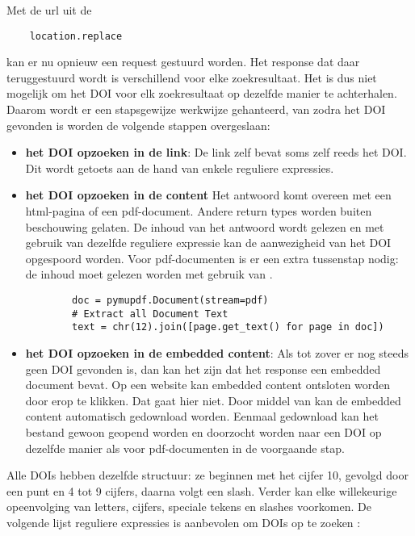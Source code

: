 Met de url uit de \begin{verbatim}
    location.replace
\end{verbatim}
kan er nu opnieuw een request gestuurd worden.
Het response dat daar teruggestuurd wordt is verschillend voor elke zoekresultaat. Het is dus niet mogelijk om het DOI voor elk zoekresultaat op dezelfde manier te achterhalen. Daarom wordt er een stapsgewijze werkwijze gehanteerd, van zodra het DOI gevonden is worden de volgende stappen overgeslaan:
\begin{itemize}
    \item \textbf{het DOI opzoeken in de link}: De link zelf bevat soms zelf reeds het DOI. Dit wordt getoets aan de hand van enkele reguliere expressies.
    \item \textbf{het DOI opzoeken in de content} Het antwoord komt overeen met een html-pagina of een pdf-document. Andere return types worden buiten beschouwing gelaten. De inhoud van het antwoord wordt gelezen en met gebruik van dezelfde reguliere expressie kan de aanwezigheid van het DOI opgespoord worden. Voor pdf-documenten is er een extra tussenstap nodig: de inhoud moet gelezen worden met gebruik van \autocite{Pymupdf2025}.
    \begin{lstlisting}
        doc = pymupdf.Document(stream=pdf)
        # Extract all Document Text
        text = chr(12).join([page.get_text() for page in doc])
    \end{lstlisting}
    \item \textbf{het DOI opzoeken in de embedded content}: Als tot zover er nog steeds geen DOI gevonden is, dan kan het zijn dat het response een embedded document bevat. Op een website kan embedded content ontsloten worden door erop te klikken. Dat gaat hier niet.  Door middel van \autocite{Selenium2025} kan de embedded content automatisch gedownload worden. Eenmaal gedownload kan het bestand gewoon geopend worden en doorzocht worden naar een DOI op dezelfde manier als voor pdf-documenten in de voorgaande stap.    
\end{itemize}
Alle DOIs hebben dezelfde structuur: ze beginnen met het cijfer 10, gevolgd door een punt en 4 tot 9 cijfers, daarna volgt een slash. Verder kan elke willekeurige opeenvolging van letters, cijfers, speciale tekens en slashes voorkomen.
De volgende lijst reguliere expressies is aanbevolen om DOIs op te zoeken \textcite{CrossrefRegex2025}:
